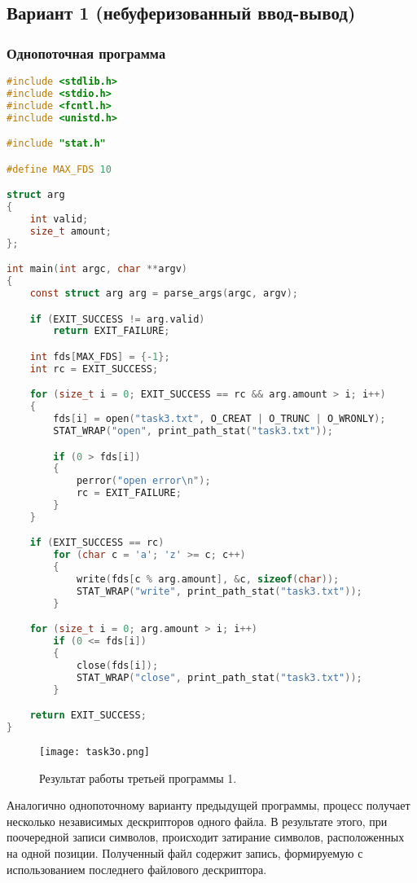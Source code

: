 
\subsection{Вариант 1 (небуферизованный ввод-вывод)}
\subsubsection{Однопоточная программа}

\begin{lstlisting}[language=c, caption={Третья программа 1 (однопоточный вариант)}]
#include <stdlib.h>
#include <stdio.h>
#include <fcntl.h>
#include <unistd.h>

#include "stat.h"

#define MAX_FDS 10

struct arg
{
    int valid;
    size_t amount;
};

int main(int argc, char **argv)
{
    const struct arg arg = parse_args(argc, argv);

    if (EXIT_SUCCESS != arg.valid)
        return EXIT_FAILURE;

    int fds[MAX_FDS] = {-1};
    int rc = EXIT_SUCCESS;

    for (size_t i = 0; EXIT_SUCCESS == rc && arg.amount > i; i++)
    {
        fds[i] = open("task3.txt", O_CREAT | O_TRUNC | O_WRONLY);
        STAT_WRAP("open", print_path_stat("task3.txt"));

        if (0 > fds[i])
        {
            perror("open error\n");
            rc = EXIT_FAILURE;
        }
    }

    if (EXIT_SUCCESS == rc)
        for (char c = 'a'; 'z' >= c; c++)
        {
            write(fds[c % arg.amount], &c, sizeof(char));
            STAT_WRAP("write", print_path_stat("task3.txt"));
        }

    for (size_t i = 0; arg.amount > i; i++)
        if (0 <= fds[i])
        {
            close(fds[i]);
            STAT_WRAP("close", print_path_stat("task3.txt"));
        }

    return EXIT_SUCCESS;
}
\end{lstlisting}

\begin{figure}[h]
    \centering
    \texttt{[image: task3o.png]}
    \caption{Результат работы третьей программы 1.}
\end{figure}

Аналогично однопоточному варианту предыдущей программы, процесс получает
несколько независимых дескрипторов одного файла. В результате этого, при
поочередной записи символов, происходит затирание символов, расположенных
на одной позиции. Полученный файл содержит запись, формируемую с использованием
последнего файлового дескриптора.

